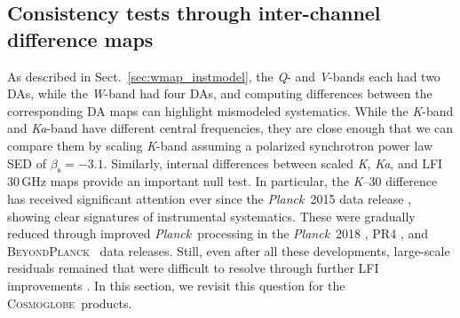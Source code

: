 \documentclass[twocolumn]{../../common/aa}
\def\WMAP{\emph{WMAP}}
\def\WMAPnine{\emph{WMAP9}}
\def\Planck{\emph{Planck}}
\newcommand{\bp}{\textsc{BeyondPlanck}}
\newcommand{\cosmoglobe}{\textsc{Cosmoglobe}}
\newcommand{\K}[0]{\textit K}
\newcommand{\Ka}[0]{\textit{Ka}}
\newcommand{\Q}[0]{\textit Q}
\newcommand{\V}[0]{\textit V}
\newcommand{\W}[0]{\textit W}
\begin{document}












\subsection{Consistency tests through inter-channel difference maps}
\label{sec:internal_consistency}

As described in Sect.~\ref{sec:wmap_instmodel}, the \Q- and \V-bands each had two DAs, while the \W-band had four DAs, and computing differences between the corresponding DA maps can highlight mismodeled systematics. While the \K-band and \Ka-band have different central frequencies, they are close enough that we can compare them by scaling \K-band assuming a polarized synchrotron power law SED of $\beta_\mathrm s=-3.1$. Similarly, internal differences between scaled \K, \Ka, and LFI 30\,GHz maps provide an important null test. In particular, the \K--30 difference has received significant attention ever since the \Planck\ 2015 data release \citep{planck2014-a01}, showing clear signatures of instrumental systematics. These were gradually reduced through improved \Planck\ processing in the \Planck\ 2018 \citep{planck2016-l02}, PR4 \citep{npipe}, and \bp\ \citep{bp01} data releases. Still, even after all these developments, large-scale residuals remained that were difficult to resolve through further LFI improvements \citep{bp07}. In this section, we revisit this question for the \cosmoglobe\ products.
\end{document}
